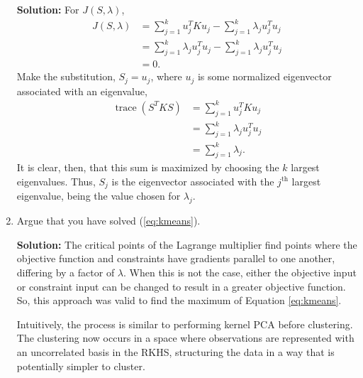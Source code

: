 \documentclass{article}[12pt]
\begin{document}
\begin{enumerate}

	 \textbf{Solution: } For $J(S, \lambda)$,
	 \begin{equation}
		 \begin{aligned}
			 J(S, \lambda) &= \sum^{k}_{j=1} u_j^T K u_j - \sum^{k}_{j=1} \lambda_j u_j^T u_j   \\
								  &= \sum^{k}_{j=1} \lambda_j u_j^T u_j - \sum^{k}_{j=1} \lambda_j u_j^T u_j  \\  
								  &= 0 .  
		 \end{aligned}
	 \end{equation}
	 Make the substitution, $S_j = u_j$, where $u_j$ is some normalized eigenvector associated with an eigenvalue,
	 \begin{equation}
		 \begin{aligned}
			 \operatorname{trace}(S^T K S) &= \sum^{k}_{j=1} u_j^T K u_j  \\
								  &= \sum^{k}_{j=1} \lambda_j u_j^T u_j \\  
								  &= \sum^{k}_{j=1} \lambda_j .  
		 \end{aligned}
	 \end{equation}
	 It is clear, then, that this sum is maximized by choosing the $k$ largest eigenvalues. Thus, $S_j$ is the eigenvector associated with the $j^{\text{th}}$ largest eigenvalue, being the value chosen for $\lambda_j$.


 \item Argue that you have solved (\ref{eq:kmeans}).

	 \textbf{Solution: } The critical points of the Lagrange multiplier find points where the objective function and constraints have gradients parallel to one another, differing by a factor of $\lambda$. When this is not the case, either the objective input or constraint input can be changed to result in a greater objective function. So, this approach was valid to find the maximum of Equation \ref{eq:kmeans}. 

	 Intuitively, the process is similar to performing kernel PCA before clustering. The clustering now occurs in a space where observations are represented with an uncorrelated basis in the RKHS, structuring the data in a way that is potentially simpler to cluster.
 

\end{enumerate}
\end{document}
